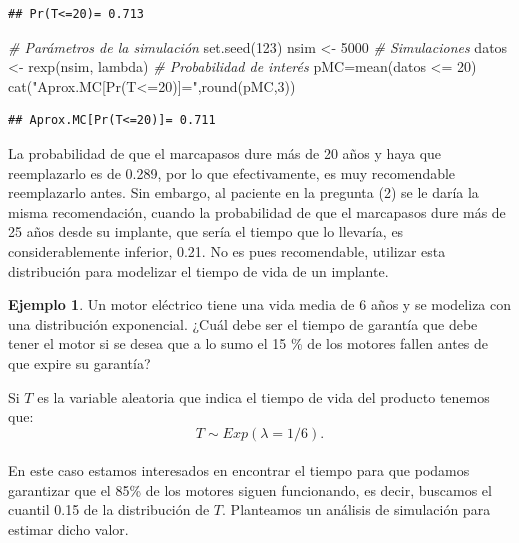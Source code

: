 \documentclass[
]{book}
\newenvironment{Shaded}{\begin{snugshade}}{\end{snugshade}}
\newcommand{\CommentTok}[1]{\textcolor[rgb]{0.56,0.35,0.01}{\textit{#1}}}
\newcommand{\DecValTok}[1]{\textcolor[rgb]{0.00,0.00,0.81}{#1}}
\newcommand{\FunctionTok}[1]{\textcolor[rgb]{0.00,0.00,0.00}{#1}}
\newcommand{\NormalTok}[1]{#1}
\newcommand{\OtherTok}[1]{\textcolor[rgb]{0.56,0.35,0.01}{#1}}
\newcommand{\SpecialCharTok}[1]{\textcolor[rgb]{0.00,0.00,0.00}{#1}}
\newcommand{\StringTok}[1]{\textcolor[rgb]{0.31,0.60,0.02}{#1}}
\theoremstyle{definition}
\theoremstyle{definition}
\newtheorem{example}{Ejemplo}[chapter]
\theoremstyle{definition}
\theoremstyle{definition}
\theoremstyle{remark}
\begin{document}
\begin{verbatim}
## Pr(T<=20)= 0.713
\end{verbatim}

\begin{Shaded}
\begin{Highlighting}[]
\CommentTok{\# Parámetros de la simulación}
\FunctionTok{set.seed}\NormalTok{(}\DecValTok{123}\NormalTok{)}
\NormalTok{nsim }\OtherTok{\textless{}{-}} \DecValTok{5000}
\CommentTok{\# Simulaciones}
\NormalTok{datos }\OtherTok{\textless{}{-}} \FunctionTok{rexp}\NormalTok{(nsim, lambda)}
\CommentTok{\# Probabilidad de interés}
\NormalTok{pMC}\OtherTok{=}\FunctionTok{mean}\NormalTok{(datos }\SpecialCharTok{\textless{}=} \DecValTok{20}\NormalTok{)}
\FunctionTok{cat}\NormalTok{(}\StringTok{"Aprox.MC[Pr(T\textless{}=20)]="}\NormalTok{,}\FunctionTok{round}\NormalTok{(pMC,}\DecValTok{3}\NormalTok{))}
\end{Highlighting}
\end{Shaded}

\begin{verbatim}
## Aprox.MC[Pr(T<=20)]= 0.711
\end{verbatim}

La probabilidad de que el marcapasos dure más de 20 años y haya que reemplazarlo es de 0.289, por lo que efectivamente, es muy recomendable reemplazarlo antes. Sin embargo, al paciente en la pregunta (2) se le daría la misma recomendación, cuando la probabilidad de que el marcapasos dure más de 25 años desde su implante, que sería el tiempo que lo llevaría, es considerablemente inferior, 0.21. No es pues recomendable, utilizar esta distribución para modelizar el tiempo de vida de un implante.

\begin{example}
\protect\hypertarget{exm:exponencial02}{}\label{exm:exponencial02}Un motor eléctrico tiene una vida media de 6 años y se modeliza con una distribución exponencial. ¿Cuál debe ser el tiempo de garantía que debe tener el motor si se desea que a lo sumo el 15 \% de los motores fallen antes de que expire su garantía?
\end{example}

Si \(T\) es la variable aleatoria que indica el tiempo de vida del producto tenemos que: \[T \sim Exp(\lambda = 1/6).\]\\
En este caso estamos interesados en encontrar el tiempo para que podamos garantizar que el 85\% de los motores siguen funcionando, es decir, buscamos el cuantil 0.15 de la distribución de \(T\). Planteamos un análisis de simulación para estimar dicho valor.
\end{document}
